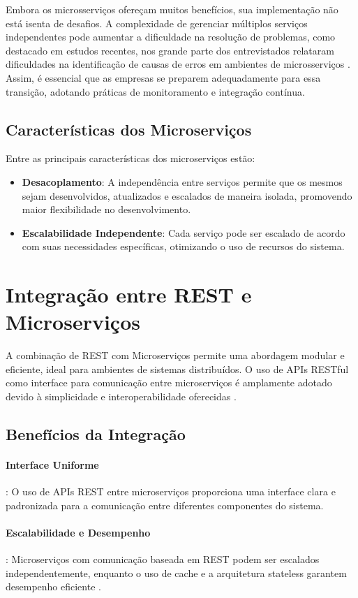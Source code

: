 \documentclass[12pt]{article}
\begin{document}
	Embora os microsserviços ofereçam muitos benefícios, sua implementação não está isenta de desafios. A complexidade de gerenciar múltiplos serviços independentes pode aumentar a dificuldade na resolução de problemas, como destacado em estudos recentes, nos grande parte dos entrevistados relataram dificuldades na identificação de causas de erros em ambientes de microsserviços \cite{castro2021}. Assim, é essencial que as empresas se preparem adequadamente para essa transição, adotando práticas de monitoramento e integração contínua.
	
	
	\subsection{Características dos Microserviços}
	Entre as principais características dos microserviços estão:
	\begin{itemize}
		\item \textbf{Desacoplamento}: A independência entre serviços permite que os mesmos sejam desenvolvidos, atualizados e escalados de maneira isolada, promovendo maior flexibilidade no desenvolvimento.
		\item \textbf{Escalabilidade Independente}: Cada serviço pode ser escalado de acordo com suas necessidades específicas, otimizando o uso de recursos do sistema.
	\end{itemize}
	
	\section{Integração entre REST e Microserviços}
	
	A combinação de REST com Microserviços permite uma abordagem modular e eficiente, ideal para ambientes de sistemas distribuídos. O uso de APIs RESTful como interface para comunicação entre microserviços é amplamente adotado devido à simplicidade e interoperabilidade oferecidas \cite{newman2015}.
	
	\subsection{Benefícios da Integração}
	\paragraph{Interface Uniforme}: O uso de APIs REST entre microserviços proporciona uma interface clara e padronizada para a comunicação entre diferentes componentes do sistema.
	\paragraph{Escalabilidade e Desempenho}: Microserviços com comunicação baseada em REST podem ser escalados independentemente, enquanto o uso de cache e a arquitetura stateless garantem desempenho eficiente \cite{cavaleiro2013}.
	
\end{document}
